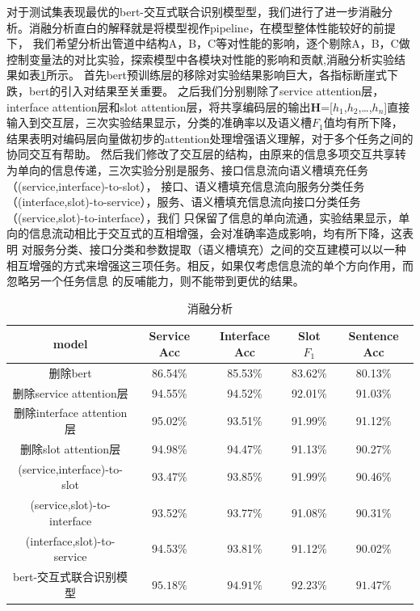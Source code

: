 对于测试集表现最优的bert-交互式联合识别模型型，我们进行了进一步消融分析。消融分析直白的解释就是将模型视作pipeline，在模型整体性能较好的前提下，
我们希望分析出管道中结构A，B，C等对性能的影响，逐个剔除A，B，C做控制变量法的对比实验，探索模型中各模块对性能的影响和贡献,消融分析实验结果如表\ref{tab:xiaorongjieguo}所示。
首先bert预训练层的移除对实验结果影响巨大，各指标断崖式下跌，bert的引入对结果至关重要。
之后我们分别剔除了service attention层，interface attention层和slot attention层，将共享编码层的输出$\mathbf{H}$=[$h_{1}$,$h_{2}$,\dots,$h_{n}$]直接
输入到交互层，三次实验结果显示，分类的准确率以及语义槽$F_1$值均有所下降，结果表明对编码层向量做初步的attention处理增强语义理解，对于多个任务之间的协同交互有帮助。
然后我们修改了交互层的结构，由原来的信息多项交互共享转为单向的信息传递，三次实验分别是服务、接口信息流向语义槽填充任务（(service,interface)-to-slot），
接口、语义槽填充信息流向服务分类任务（(interface,slot)-to-service），服务、语义槽填充信息流向接口分类任务（(service,slot)-to-interface），我们
只保留了信息的单向流通，实验结果显示，单向的信息流动相比于交互式的互相增强，会对准确率造成影响，均有所下降，这表明
对服务分类、接口分类和参数提取（语义槽填充）之间的交互建模可以以一种相互增强的方式来增强这三项任务。相反，如果仅考虑信息流的单个方向作用，而忽略另一个任务信息
的反哺能力，则不能带到更优的结果。
\begin{table}[htb]
  \centering
  \caption{消融分析}
  \label{tab:xiaorongjieguo}
\begin{tabular}{c|cccc}
  \toprule
 model&Service Acc&Interface Acc&Slot $F_1$&Sentence Acc\\
 \hline
 删除bert&86.54\%&85.53\%&83.62\%&80.13\%\\
 删除service attention层&94.55\%&94.52\%&92.01\%&91.03\%\\
 删除interface attention层&95.02\%&93.51\%&91.99\%&91.12\%\\
 删除slot attention层&94.98\%&94.47\%&91.13\%&90.27\%\\
 (service,interface)-to-slot&93.47\%&93.85\%&91.99\%&90.46\%\\
 (service,slot)-to-interface&93.52\%&93.77\%&91.08\%&90.31\%\\
 (interface,slot)-to-service&94.53\%&93.81\%&91.12\%&90.02\%\\
 bert-交互式联合识别模型&$\mathbf{95.18\%}$&$\mathbf{94.91}\%$&$\mathbf{92.23}\%$&$\mathbf{91.47}\%$\\
\bottomrule
\end{tabular}
\end{table}
